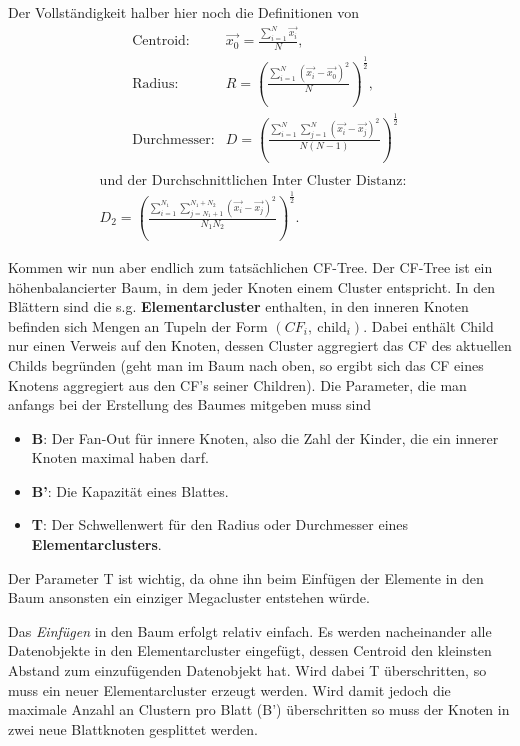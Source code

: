 Der Vollständigkeit halber hier noch die Definitionen von
\begin{align*}
&\text{Centroid:} &\vec{x_0} = \frac{\sum_{i=1}^N \vec{x_i}}{N},\\
&\text{Radius:} &R =\left( \frac{\sum_{i=1}^N \left(\vec{x_i}-\vec{x_0}
\right)^2}{N}\right)^{\frac{1}{2}},\\
&\text{Durchmesser:} &D = \left( \frac{\sum_{i=1}^N \sum_{j=1}^{N} \left(\vec{x_i}-\vec{x_j}
\right)^2}{N(N-1)}\right)^{\frac{1}{2}}\\
\end{align*}
\begin{align*}
&\text{und der Durchschnittlichen Inter Cluster Distanz:} &\quad\\
 &D_2 = \left( \frac{\sum_{i=1}^{N_1} \sum_{j=N_1 +1}^{N_1 + N_2} \left(\vec{x_i}-\vec{x_j}
\right)^2}{N_1 N_2}\right)^{\frac{1}{2}}. &
\end{align*}

Kommen wir nun aber endlich zum tatsächlichen CF-Tree. Der CF-Tree ist
ein höhenbalancierter Baum, in dem jeder Knoten einem Cluster entspricht. 
In den Blättern sind die s.g. \textbf{Elementarcluster} enthalten, in den 
inneren Knoten befinden sich Mengen an Tupeln der Form \((CF_i,\ \text{
child}_i)\). Dabei enthält Child nur einen Verweis auf den Knoten, dessen 
Cluster aggregiert das CF des aktuellen Childs begründen (geht man im
Baum nach oben, so ergibt sich das CF eines Knotens aggregiert aus den
CF's seiner Children). Die Parameter, die man anfangs bei der Erstellung
des Baumes mitgeben muss sind
\begin{itemize}
\item \textbf{B}: Der Fan-Out für innere Knoten, also die Zahl der Kinder,
die ein innerer Knoten maximal haben darf.
\item \textbf{B'}: Die Kapazität eines Blattes.
\item \textbf{T}: Der Schwellenwert für den Radius oder Durchmesser
eines \textbf{Elementarclusters}.
\end{itemize}
Der Parameter T ist wichtig, da ohne ihn beim Einfügen der Elemente
in den Baum ansonsten ein einziger Megacluster entstehen würde.

Das \textit{Einfügen} in den Baum erfolgt relativ einfach. Es werden
nacheinander alle Datenobjekte in den Elementarcluster eingefügt, dessen
Centroid den kleinsten Abstand zum einzufügenden Datenobjekt hat. Wird
dabei T überschritten, so muss ein neuer Elementarcluster erzeugt werden.
Wird damit jedoch die maximale Anzahl an Clustern pro Blatt (B') überschritten
so muss der Knoten in zwei neue Blattknoten gesplittet werden.


